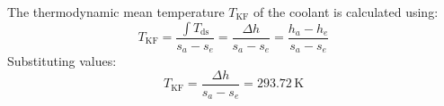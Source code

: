 The thermodynamic mean temperature \( T_{\text{KF}} \) of the coolant is calculated using:  
\[
T_{\text{KF}} = \frac{\int T_{\text{ds}}}{s_a - s_e} = \frac{\Delta h}{s_a - s_e} = \frac{h_a - h_e}{s_a - s_e}
\]  
Substituting values:  
\[
T_{\text{KF}} = \frac{\Delta h}{s_a - s_e} = 293.72 \, \text{K}
\]
